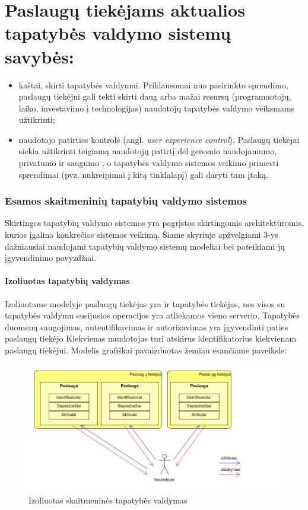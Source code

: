 \chapter{\textbf{Paslaugų tiekėjams aktualios tapatybės valdymo sistemų savybės:}}

\begin{itemize}
    \item kaštai, skirti tapatybės valdymui. Priklausomai nuo pasirinkto sprendimo,
    paslaugų tiekėjui gali tekti skirti daug arba mažai resursų (programuotojų, laiko, investavimo į technologijas)
    naudotojų tapatybės valdymo veiksmams užtikrinti;
    \item naudotojo patirties kontrolė (angl. \textit{user experience control}). Paslaugų tiekėjai siekia užtikrinti teigiamą
    naudotojų patirtį dėl geresnio naudojamumo, privatumo ir saugumo \cite{Dhamija2008}, o tapatybės valdymo sistemos veikimo primesti sprendimai (pvz. nukreipimai į kitą tinklalapį) gali daryti
    tam įtaką.
\end{itemize}

\subsection{Esamos skaitmeninių tapatybių valdymo sistemos}

Skirtingos tapatybių valdymo sistemos yra pagrįstos skirtingomis architektūromis, kurios įgalina
konkrečios sistemos veikimą. Šiame skyriuje apžvelgiami 3-ys dažniausiai naudojami tapatybių valdymo sistemų
modeliai bei pateikiami jų įgyvendinimo pavyzdžiai.

\subsubsection{Izoliuotas tapatybių valdymas}


Izoliuotame modelyje paslaugų tiekėjas yra ir tapatybės tiekėjas, nes visos su tapatybės valdymu
susijusios operacijos yra atliekamos vieno serverio. Tapatybės duomenų saugojimas, autentifikavimas
ir autorizavimas yra įgyvendinti paties paslaugų tiekėjo \cite{Cao2010} Kiekvienas naudotojas turi atskirus identifikatorius
kiekvienam paslaugų tiekėjui. Modelis grafiškai pavaizduotas žemiau esančiame paveiksle:

\begin{figure}[H]
    \centering
    \includegraphics[scale=0.65]{img/IsolatedModel}
    \caption{Izoliuotas skaitmeninės tapatybės valdymas \cite{Cao2010}}
\end{figure}

